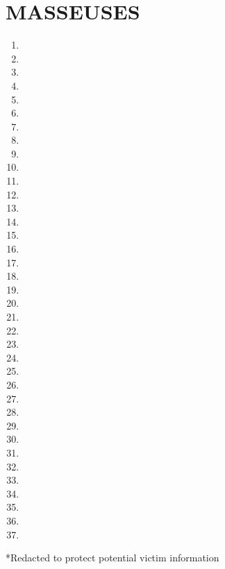 \documentclass[10pt]{article}
\begin{document}
\section*{MASSEUSES}
\begin{enumerate}
  \item 
  \item 
  \item 
  \item 
  \item 
  \item 
  \item 
  \item 
  \item 
  \item 
  \item 
  \item 
  \item 
  \item 
  \item 
  \item 
  \item 
  \item 
  \item 
  \item 
  \item 
  \item 
  \item 
  \item 
  \item 
  \item 
  \item 
  \item 
  \item 
  \item 
  \item 
  \item 
  \item 
  \item 
  \item 
  \item 
  \item 
\end{enumerate}

*Redacted to protect potential victim information
\end{document}
